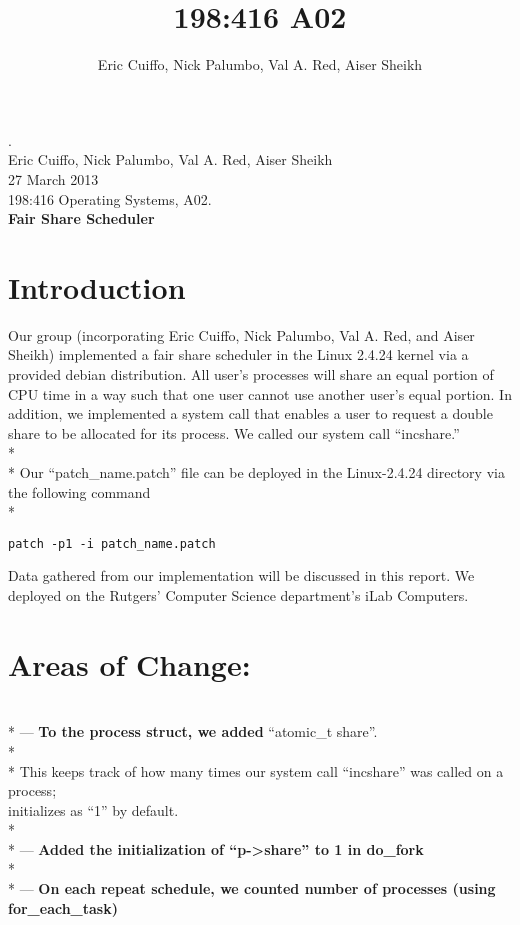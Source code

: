 \documentclass[10pt]{article}
\begin{document}
\title{198:416 A02}
\author{Eric Cuiffo, Nick Palumbo, Val A. Red, Aiser Sheikh}

\fancyhead{}
.\\
Eric Cuiffo, Nick Palumbo, Val A. Red, Aiser Sheikh\\
27 March 2013 \\
198:416 Operating Systems, A02. \\
{\bfseries Fair Share Scheduler}

\section{Introduction}

Our group (incorporating Eric Cuiffo, Nick Palumbo, Val A. Red, and Aiser Sheikh) implemented a fair 
share scheduler in the Linux 2.4.24 kernel via a provided debian distribution. 
All user's processes will share an equal portion of CPU time in a way such that one
user cannot use another user's equal portion. In addition, we implemented a system call
that enables a user to request a double share to be allocated for its process. We called
our system call ``incshare.'' \\* \\*
\hspace*{36pt} Our ``patch\_name.patch'' file can be deployed in the Linux-2.4.24 directory via the following command \\*
\begin{verbatim}
patch -p1 -i patch_name.patch
\end{verbatim}

Data gathered from our implementation will be discussed in this report. We deployed on the
Rutgers' Computer Science department's iLab Computers. 

\section{Areas of Change:}
\\*
--- {\bfseries To the process struct, we added} ``atomic\_t share''. \\* \\*
\hspace*{36pt} This keeps track of how many times our system call ``incshare'' was
called on a process; \\ 
\hspace*{36pt} initializes as ``1'' by default. \\* \\* 
--- {\bfseries Added the initialization of ``p-\textgreater share'' to 1 in do\_fork} \\* \\*
--- {\bfseries On each repeat schedule, we counted number of processes (using for\_each\_task)}
\end{document}
